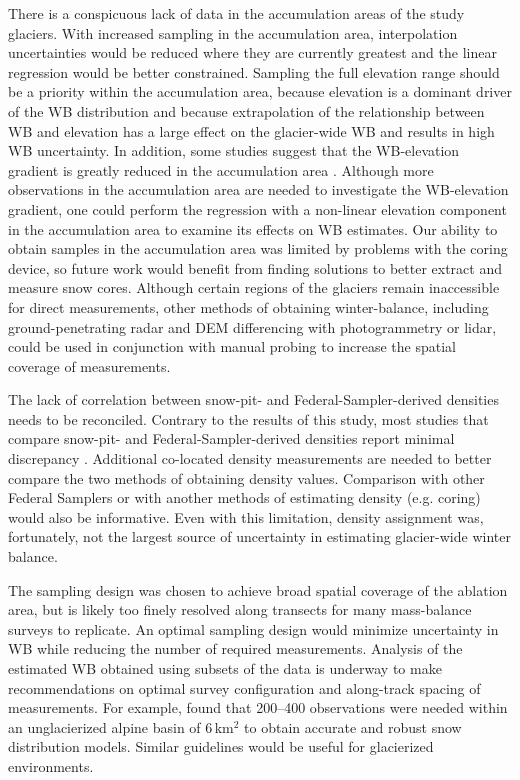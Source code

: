\documentclass{sfuthesis}
\begin{document}
There is a conspicuous lack of data in the accumulation areas of the study glaciers. With increased sampling in the accumulation area, interpolation uncertainties would be reduced where they are currently greatest and the linear regression would be better constrained. Sampling the full elevation range should be a priority within the accumulation area, because elevation is a dominant driver of the WB distribution and because extrapolation of the relationship between WB and elevation has a large effect on the glacier-wide WB and results in high WB uncertainty. In addition, some studies suggest that the WB-elevation gradient is greatly reduced in the accumulation area \citep[e.g.][]{Winther1998}. Although more observations in the accumulation area are needed to investigate the WB-elevation gradient, one could perform the regression with a non-linear elevation component in the accumulation area to examine its effects on WB estimates. Our ability to obtain samples in the accumulation area was limited by problems with the coring device, so future work would benefit from finding solutions to better extract and measure snow cores. Although certain regions of the glaciers remain inaccessible for direct measurements, other methods of obtaining winter-balance, including ground-penetrating radar and DEM differencing with photogrammetry or lidar, could be used in conjunction with manual probing to increase the spatial coverage of measurements.

The lack of correlation between snow-pit- and Federal-Sampler-derived densities needs to be reconciled. Contrary to the results of this study, most studies that compare snow-pit- and Federal-Sampler-derived densities report minimal discrepancy \citep[e.g.][and sources within]{Dixon2012}. Additional co-located density measurements are needed to better compare the two methods of obtaining density values. Comparison with other Federal Samplers or with another methods of estimating density (e.g. coring) would also be informative. Even with this limitation, density assignment was, fortunately, not the largest source of uncertainty in estimating glacier-wide winter balance. 

The sampling design was chosen to achieve broad spatial coverage of the ablation area, but is likely too finely resolved along transects for many mass-balance surveys to replicate. An optimal sampling design would minimize uncertainty in WB while reducing the number of required measurements. Analysis of the estimated WB obtained using subsets of the data is underway to make recommendations on optimal survey configuration and along-track spacing of measurements. For example, \cite{Lopez2010} found that 200--400 observations were needed within an unglacierized alpine basin of 6\,km$^2$ to obtain accurate and robust snow distribution models. Similar guidelines would be useful for glacierized environments.
\end{document}
